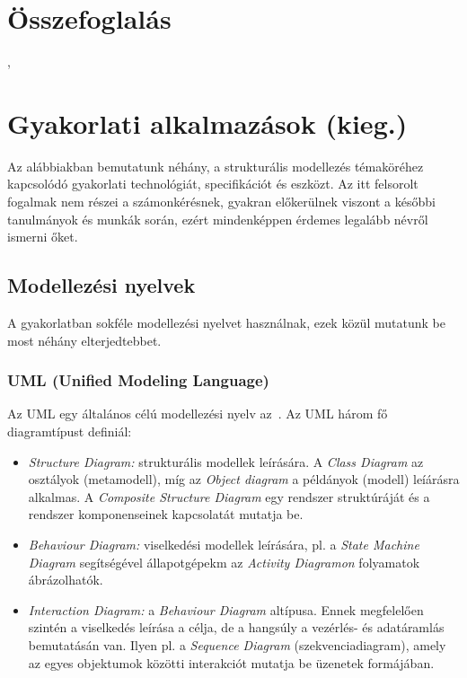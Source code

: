 \section{Összefoglalás}

, 


\section{Gyakorlati alkalmazások (kieg.)}

Az alábbiakban bemutatunk néhány, a strukturális modellezés témaköréhez kapcsolódó gyakorlati technológiát, specifikációt és eszközt. Az itt felsorolt fogalmak nem részei a számonkérésnek, gyakran előkerülnek viszont a későbbi tanulmányok és munkák során, ezért mindenképpen érdemes legalább névről ismerni őket.

\subsection{Modellezési nyelvek}

A gyakorlatban sokféle modellezési nyelvet használnak, ezek közül mutatunk be most néhány elterjedtebbet.

\subsubsection{UML (Unified Modeling Language)}

Az UML egy általános célú modellezési nyelv az~\cite{UML}. Az UML három fő diagramtípust definiál:

\begin{itemize}
	\item \emph{Structure Diagram:} strukturális modellek leírására. A \emph{Class Diagram} az osztályok (metamodell), míg az \emph{Object diagram} a példányok (modell) leíárásra alkalmas. A \emph{Composite Structure Diagram} egy rendszer struktúráját és a rendszer komponenseinek kapcsolatát mutatja be.
	\item \emph{Behaviour Diagram:} viselkedési modellek leírására, pl. a \emph{State Machine Diagram} segítségével állapotgépekm az \emph{Activity Diagramon} folyamatok ábrázolhatók.
	\item \emph{Interaction Diagram:} a \emph{Behaviour Diagram} altípusa. Ennek megfelelően szintén a viselkedés leírása a célja, de a hangsúly a vezérlés- és adatáramlás bemutatásán van. Ilyen pl. a \emph{Sequence Diagram} (szekvenciadiagram), amely az egyes objektumok közötti interakciót mutatja be üzenetek formájában.
\end{itemize}

